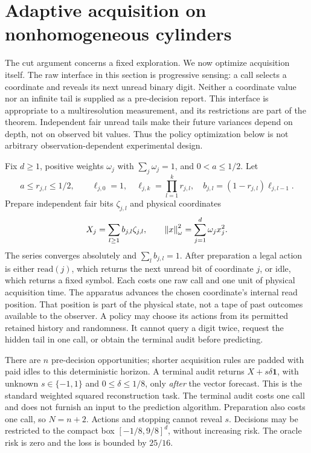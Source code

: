 \section{Adaptive acquisition on nonhomogeneous cylinders}\label{sec:adaptive}
The cut argument concerns a fixed exploration. We now optimize acquisition itself. The raw interface in this section is progressive sensing: a call selects a coordinate and reveals its next unread binary digit. Neither a coordinate value nor an infinite tail is supplied as a pre-decision report. This interface is appropriate to a multiresolution measurement, and its restrictions are part of the theorem. Independent fair unread tails make their future variances depend on depth, not on observed bit values. Thus the policy optimization below is not arbitrary observation-dependent experimental design.

Fix $d\ge1$, positive weights $\omega_j$ with $\sum_j\omega_j=1$, and $0<a\le1/2$. Let
\begin{equation}\label{eq:scales}
 a\le r_{j,l}\le1/2,\qquad
 \ell_{j,0}=1,\quad \ell_{j,k}=\prod_{l=1}^k r_{j,l},\quad
 b_{j,l}=(1-r_{j,l})\ell_{j,l-1}.
\end{equation}
Prepare independent fair bits $\zeta_{j,l}$ and physical coordinates
\begin{equation}\label{eq:cylinders}
 X_j=\sum_{l\ge1}b_{j,l}\zeta_{j,l},\qquad
 \left\lVert x\right\rVert_\omega^2=\sum_{j=1}^d\omega_jx_j^2.
\end{equation}
The series converges absolutely and $\sum_l b_{j,l}=1$. After preparation a legal action is either $\mathrm{read}(j)$, which returns the next unread bit of coordinate $j$, or $\mathrm{idle}$, which returns a fixed symbol. Each costs one raw call and one unit of physical acquisition time. The apparatus advances the chosen coordinate's internal read position. That position is part of the physical state, not a tape of past outcomes available to the observer. A policy may choose its actions from its permitted retained history and randomness. It cannot query a digit twice, request the hidden tail in one call, or obtain the terminal audit before predicting.

There are $n$ pre-decision opportunities; shorter acquisition rules are padded with paid idles to this deterministic horizon. A terminal audit returns $X+s\delta\mathbf 1$, with unknown $s\in\{-1,1\}$ and $0\le\delta\le1/8$, only \emph{after} the vector forecast. This is the standard weighted squared reconstruction task. The terminal audit costs one call and does not furnish an input to the prediction algorithm. Preparation also costs one call, so $N=n+2$. Actions and stopping cannot reveal $s$. Decisions may be restricted to the compact box $[-1/8,9/8]^d$, without increasing risk. The oracle risk is zero and the loss is bounded by $25/16$.

